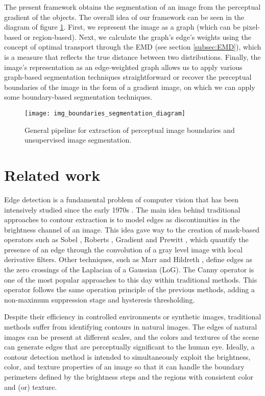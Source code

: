 The present framework obtains the segmentation of an image from the perceptual gradient of the objects. The overall idea of our framework can be seen in the diagram of figure \ref{fig:pipeline_gabor_image_segmentation}. First, we represent the image as a graph (which can be pixel-based or region-based). Next, we calculate the graph's edge's weights using the concept of optimal transport through the EMD (see section \ref{subsec:EMD}), which is a measure that reflects the true distance between two distributions. Finally, the image's representation as an edge-weighted graph allows us to apply various graph-based segmentation techniques straightforward or recover the perceptual boundaries of the image in the form of a gradient image, on which we can apply some boundary-based segmentation techniques. 

\begin{figure}[!ht]
	\centering
	\texttt{[image: img\_boundaries\_segmentation\_diagram]}
	\caption{General pipeline for extraction of perceptual image boundaries and unsupervised image segmentation.}\label{fig:pipeline_gabor_image_segmentation}
\end{figure}

\section{Related work}\label{sec:soa_boundaries_segmentation}
Edge detection is a fundamental problem of computer vision that has been intensively studied since the early 1970s \citep{Hueckel:JACM:1971, Fram.Deutsch:TC:1975}. The main idea behind traditional approaches to contour extraction is to model edges as discontinuities in the brightness channel of an image. This idea gave way to the creation of mask-based operators such as Sobel \citep{Sobel.Feldman:SAIL:1990}, Roberts \citep{Roberts:Thesis:1963}, Gradient \citep{Maitre:Book:2003} and Prewitt \citep{Prewitt:PPP:1970}, which quantify the presence of an edge through the convolution of a gray level image with local derivative filters. Other techniques, such as Marr and Hildreth \citep{Marr.Hildreth:PRS:1980}, define edges as the zero crossings of the Laplacian of a Gaussian (LoG). The Canny operator \citep{Canny:PAMI:1986} is one of the most popular approaches to this day within traditional methods. This operator follows the same operation principle of the previous methods, adding a non-maximum suppression stage and hysteresis thresholding. 

Despite their efficiency in controlled environments or synthetic images, traditional methods suffer from identifying contours in natural images. The edges of natural images can be present at different scales, and the colors and textures of the scene can generate edges that are perceptually significant to the human eye. Ideally, a contour detection method is intended to simultaneously exploit the brightness, color, and texture properties of an image so that it can handle the boundary perimeters defined by the brightness steps and the regions with consistent color and (or) texture.

